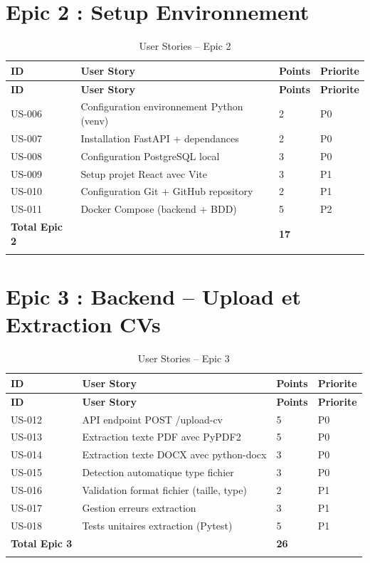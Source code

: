 ﻿\documentclass[12pt,a4paper]{report}
\begin{document}
\section{Epic 2 : Setup Environnement}

\begin{longtable}{|p{1.5cm}|p{7cm}|p{2cm}|p{2cm}|}
\hline
\rowcolor{bleu3S!20}
\textbf{ID} & \textbf{User Story} & \textbf{Points} & \textbf{Priorite} \\
\hline
\endfirsthead
\hline \rowcolor{bleu3S!20} \textbf{ID} & \textbf{User Story} & \textbf{Points} & \textbf{Priorite} \\ \hline
\endhead
US-006 & Configuration environnement Python (venv) & 2 & P0 \\ \hline
US-007 & Installation FastAPI + dependances & 2 & P0 \\ \hline
US-008 & Configuration PostgreSQL local & 3 & P0 \\ \hline
US-009 & Setup projet React avec Vite & 3 & P1 \\ \hline
US-010 & Configuration Git + GitHub repository & 2 & P1 \\ \hline
US-011 & Docker Compose (backend + BDD) & 5 & P2 \\ \hline
\rowcolor{grisleger} \textbf{Total Epic 2} & & \textbf{17} & \\ \hline
\caption{User Stories -- Epic 2}
\end{longtable}

\section{Epic 3 : Backend -- Upload et Extraction CVs}

\begin{longtable}{|p{1.5cm}|p{7cm}|p{2cm}|p{2cm}|}
\hline
\rowcolor{bleu3S!20}
\textbf{ID} & \textbf{User Story} & \textbf{Points} & \textbf{Priorite} \\
\hline
\endfirsthead
\hline \rowcolor{bleu3S!20} \textbf{ID} & \textbf{User Story} & \textbf{Points} & \textbf{Priorite} \\ \hline
\endhead
US-012 & API endpoint POST /upload-cv & 5 & P0 \\ \hline
US-013 & Extraction texte PDF avec PyPDF2 & 5 & P0 \\ \hline
US-014 & Extraction texte DOCX avec python-docx & 3 & P0 \\ \hline
US-015 & Detection automatique type fichier & 3 & P0 \\ \hline
US-016 & Validation format fichier (taille, type) & 2 & P1 \\ \hline
US-017 & Gestion erreurs extraction & 3 & P1 \\ \hline
US-018 & Tests unitaires extraction (Pytest) & 5 & P1 \\ \hline
\rowcolor{grisleger} \textbf{Total Epic 3} & & \textbf{26} & \\ \hline
\caption{User Stories -- Epic 3}
\end{longtable}
\end{document}
